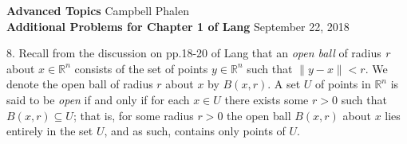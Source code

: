 \documentclass[11pt]{article}
\begin{document}
	{\bfseries Advanced Topics} \hspace*{\fill} Campbell Phalen \\
	{\bfseries Additional Problems for Chapter 1 of Lang} \hspace*{\fill}September 22, 2018
	\vspace{1pc}

	\hrulefill
	\vspace{1pc}
 
8. Recall from the discussion on pp.18-20 of Lang that an \textit{open ball} of radius \textit{r} about $x \in \mathbb{R}^n$ consists of the set of points $y \in \mathbb{R}^n$ such that $\|y-x\| < r$. We denote the open ball of radius $r$ about $x$ by $B(x,r)$. A set $U$ of points in $\mathbb{R}^n$ is said to be \textit{open} if and only if for each $x \in U$ there exists some $r > 0$ such that $B(x,r) \subseteq U$; that is, for some radius $r > 0$ the open ball $B(x,r)$ about $x$ lies entirely in the set $U$, and as such, contains only points of $U$.

\vspace{1pc}
\end{document}
